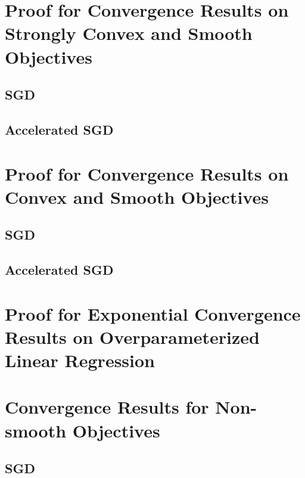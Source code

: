 




\section{Proof for Convergence Results on Strongly Convex and Smooth Objectives}

\subsection{SGD}


\subsection{Accelerated SGD}
\label{sec:nasgdscvxsmth}


\section{Proof for Convergence Results on Convex and Smooth Objectives}

\subsection{SGD}
\label{sec:convexsmoothsgd}
% 


\subsection{Accelerated SGD}
\label{sec:nasgdcvxsmth}


\section{Proof for Exponential Convergence Results on Overparameterized Linear Regression}
\label{sec:interpolation}


\section{Convergence Results for Non-smooth Objectives}

\subsection{SGD}
